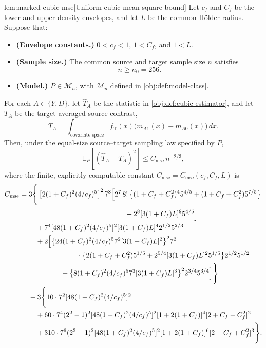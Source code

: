 \begin{lemmav}{lem:marked-cubic-mse}[Uniform cubic mean-square bound]
Let \(c_f\) and \(C_f\) be the lower and upper density envelopes, and let \(L\) be the common Hölder radius. Suppose that:
\begin{itemize}
\item \textbf{(Envelope constants.)} \(0<c_f<1\), \(1<C_f\), and \(1<L\).
\item \textbf{(Sample size.)} The common source and target sample size \(n\) satisfies
\[
n\ge n_0=256.
\]
\item \textbf{(Model.)} \(P\in\mathcal M_n\), with \(\mathcal M_n\) defined in \cref{obj:def:model-class}.
\end{itemize}
For each \(A\in\{Y,D\}\), let \(\widehat T_A\) be the statistic in \cref{obj:def:cubic-estimator}, and let \(T_A\) be the target-averaged source contrast,
\[
T_A
=
\int_{\text{covariate space}}
f_{\mathrm T}(x)\bigl(m_{A1}(x)-m_{A0}(x)\bigr)\,dx.
\]
Then, under the equal-size source–target sampling law specified by \(P\),
\[
\mathbb E_P\!\left[(\widehat T_A-T_A)^2\right]
\le C_{\mathrm{mse}}\,n^{-2/3},
\]
where the finite, explicitly computable constant \(C_{\mathrm{mse}}=C_{\mathrm{mse}}(c_f,C_f,L)\) is
\[
\begin{aligned}
C_{\mathrm{mse}}
={}&3\Bigg\{
\left[2(1+C_f)^2(4/c_f)^5\right]^2 7^8
\Big[
2^7\,8!\,
\big\{(1+C_f+C_f^2)^4 5^{4/5}
 +(1+C_f+C_f^2)5^{7/5}\big\}\\
&\hspace{48mm}
+2^8[3(1+C_f)L]^8 5^{4/5}
\Big]\\
&\quad
+7^4[48(1+C_f)^2(4/c_f)^5]^2
 [3(1+C_f)L]^4 2^{1/2}5^{2/3}\\
&\quad
+2\Big[
\big\{24(1+C_f)^2(4/c_f)^5
       7^2[3(1+C_f)L]^2\big\}^2
 7^2\\
&\hspace{24mm}\cdot
\big\{2(1+C_f+C_f^2)5^{1/5}
 +2^{5/4}[3(1+C_f)L]^2 5^{1/5}\big\}
 2^{1/2}5^{1/2}\\
&\hspace{16mm}
+\big\{8(1+C_f)^2(4/c_f)^5
       7^3[3(1+C_f)L]^3\big\}^2
 2^{3/4}5^{3/4}
\Big]
\Bigg\}\\
&+3\Bigg\{
10\cdot7^2[48(1+C_f)^2(4/c_f)^5]^2\\
&\quad
+60\cdot7^4(2^2-1)^2
 [48(1+C_f)^2(4/c_f)^5]^2
 [1+2(1+C_f)]^4[2+C_f+C_f^2]^2\\
&\quad
+310\cdot7^6(2^3-1)^2
 [48(1+C_f)^2(4/c_f)^5]^2
 [1+2(1+C_f)]^6[2+C_f+C_f^2]^3
\Bigg\}.
\end{aligned}
\]
\end{lemmav}

